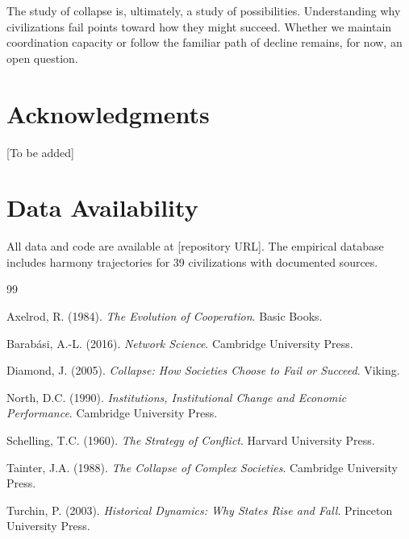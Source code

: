 \documentclass[11pt,a4paper]{article}
\begin{document}
The study of collapse is, ultimately, a study of possibilities. Understanding why civilizations fail points toward how they might succeed. Whether we maintain coordination capacity or follow the familiar path of decline remains, for now, an open question.

\section*{Acknowledgments}
[To be added]

\section*{Data Availability}
All data and code are available at [repository URL]. The empirical database includes harmony trajectories for 39 civilizations with documented sources.


\begin{thebibliography}{99}

Axelrod, R. (1984). \textit{The Evolution of Cooperation}. Basic Books.

Barab{\'a}si, A.-L. (2016). \textit{Network Science}. Cambridge University Press.

Diamond, J. (2005). \textit{Collapse: How Societies Choose to Fail or Succeed}. Viking.

North, D.C. (1990). \textit{Institutions, Institutional Change and Economic Performance}. Cambridge University Press.

Schelling, T.C. (1960). \textit{The Strategy of Conflict}. Harvard University Press.

Tainter, J.A. (1988). \textit{The Collapse of Complex Societies}. Cambridge University Press.

Turchin, P. (2003). \textit{Historical Dynamics: Why States Rise and Fall}. Princeton University Press.

\end{thebibliography}
\end{document}
